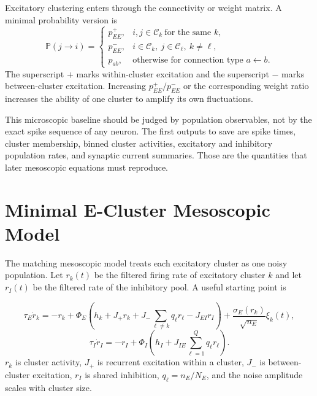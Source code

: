 Excitatory clustering enters through the connectivity or weight matrix. A minimal probability version is
%
\begin{equation}
  \mathbb{P}(j\to i)
  =
  \begin{cases}
    p_{EE}^{+}, & i,j\in \mathcal{C}_k \ \text{for the same } k,\\
    p_{EE}^{-}, & i\in\mathcal{C}_k,\ j\in\mathcal{C}_{\ell},\ k\ne \ell,\\
    p_{ab}, & \text{otherwise for connection type } a\leftarrow b .
  \end{cases}
  \label{eq:e-cluster-connection-probabilities}
\end{equation}
%
The superscript $+$ marks within-cluster excitation and the superscript $-$ marks between-cluster excitation. Increasing $p_{EE}^{+}/p_{EE}^{-}$ or the corresponding weight ratio increases the ability of one cluster to amplify its own fluctuations.

This microscopic baseline should be judged by population observables, not by the exact spike sequence of any neuron. The first outputs to save are spike times, cluster membership, binned cluster activities, excitatory and inhibitory population rates, and synaptic current summaries. Those are the quantities that later mesoscopic equations must reproduce.

\section{Minimal E-Cluster Mesoscopic Model}
\label{sec:minimal-e-cluster-mesoscopic-model}

The matching mesoscopic model treats each excitatory cluster as one noisy population. Let $r_k(t)$ be the filtered firing rate of excitatory cluster $k$ and let $r_I(t)$ be the filtered rate of the inhibitory pool. A useful starting point is
%
\begin{keyequation}
\begin{equation}
  \tau_E \dot r_k
  =
  -r_k
  +
  \Phi_E\!\left(
    h_k
    +
    J_{+}r_k
    +
    J_{-}\sum_{\ell\ne k} q_{\ell}r_{\ell}
    -
    J_{EI} r_I
  \right)
  +
  \frac{\sigma_E(r_k)}{\sqrt{n_E}}\xi_k(t),
  \label{eq:minimal-e-cluster-mesoscopic}
\end{equation}
\begin{equation}
  \tau_I \dot r_I
  =
  -r_I
  +
  \Phi_I\!\left(
    h_I
    +
    J_{IE}\sum_{\ell=1}^{Q}q_{\ell}r_{\ell}
  \right).
  \label{eq:minimal-shared-inhibition}
\end{equation}
\tcblower
$r_k$ is cluster activity, $J_{+}$ is recurrent excitation within a cluster, $J_{-}$ is between-cluster excitation, $r_I$ is shared inhibition, $q_{\ell}=n_E/N_E$, and the noise amplitude scales with cluster size.
\end{keyequation}

